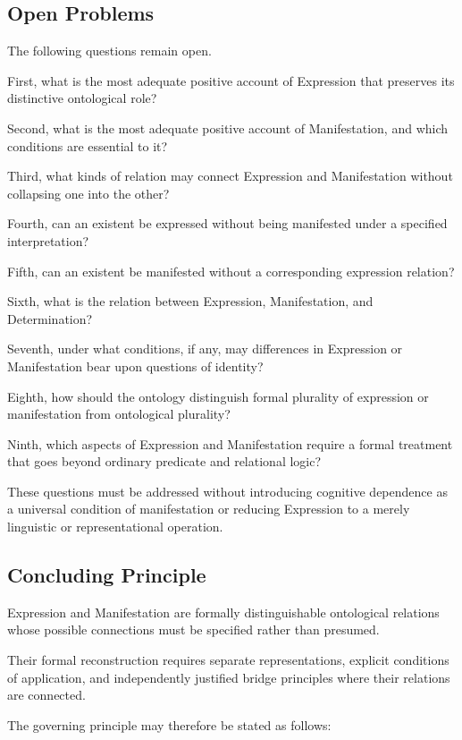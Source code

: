 \subsection{Open Problems}

The following questions
remain open.

First, what is the
most adequate positive
account of Expression
that preserves its
distinctive ontological
role?

Second, what is the
most adequate positive
account of Manifestation,
and which conditions
are essential to it?

Third, what kinds
of relation may connect
Expression and Manifestation
without collapsing
one into the other?

Fourth, can an existent
be expressed without
being manifested under
a specified interpretation?

Fifth, can an existent
be manifested without
a corresponding
expression relation?

Sixth, what is the
relation between
Expression, Manifestation,
and Determination?

Seventh, under what
conditions, if any,
may differences in
Expression or Manifestation
bear upon questions
of identity?

Eighth, how should
the ontology distinguish
formal plurality of
expression or manifestation
from ontological plurality?

Ninth, which aspects
of Expression and
Manifestation require
a formal treatment
that goes beyond
ordinary predicate
and relational logic?

These questions
must be addressed
without introducing
cognitive dependence
as a universal
condition of manifestation
or reducing Expression
to a merely linguistic
or representational
operation.

\subsection{Concluding Principle}

Expression and Manifestation
are formally distinguishable
ontological relations
whose possible connections
must be specified
rather than presumed.

Their formal reconstruction
requires separate
representations, explicit
conditions of application,
and independently
justified bridge principles
where their relations
are connected.

The governing principle
may therefore be stated
as follows:

